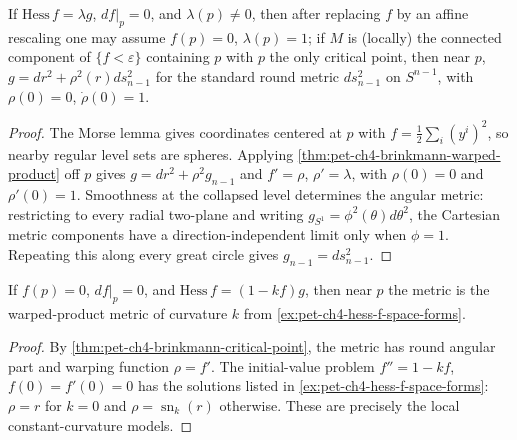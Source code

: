 \begin{theorem}
  \label{thm:pet-ch4-brinkmann-critical-point}
  If $\mathrm{Hess}\,f=\lambda g$, $df|_p=0$, and $\lambda(p)\ne0$, then after
  replacing $f$ by an affine rescaling one may assume $f(p)=0$, $\lambda(p)=1$;
  if $M$ is (locally) the connected component of $\{f<\varepsilon\}$ containing
  $p$ with $p$ the only critical point, then near $p$,
  $g=dr^2+\rho^2(r)ds_{n-1}^2$ for the standard round metric $ds_{n-1}^2$ on
  $S^{n-1}$, with $\rho(0)=0$, $\dot\rho(0)=1$.
\end{theorem}
\begin{proof}
  \sketch
  The Morse lemma gives coordinates centered at $p$ with
  $f=\tfrac12\sum_i(y^i)^2$, so nearby regular level sets are spheres. Applying
  \cref{thm:pet-ch4-brinkmann-warped-product} off $p$ gives
  $g=dr^2+\rho^2g_{n-1}$ and
  $f'=\rho$, $\rho'=\lambda$, with
  $\rho(0)=0$ and $\rho'(0)=1$. Smoothness at the collapsed level determines
  the angular metric: restricting to every radial two-plane and writing
  $g_{S^1}=\phi^2(\theta)d\theta^2$, the Cartesian metric components have a
  direction-independent limit only when $\phi=1$. Repeating this along every
  great circle gives $g_{n-1}=ds_{n-1}^2$.
\end{proof}


\begin{corollary}
  \label{cor:pet-ch4-brinkmann-constant-curvature}
  If $f(p)=0$, $df|_p=0$, and $\mathrm{Hess}\,f=(1-kf)g$, then near $p$ the metric
  is the warped-product metric of curvature $k$ from
  \cref{ex:pet-ch4-hess-f-space-forms}.
\end{corollary}
\begin{proof}
  \sketch
  By \cref{thm:pet-ch4-brinkmann-critical-point}, the metric has round angular
  part and warping function $\rho=f'$. The initial-value problem
  $f''=1-kf$, $f(0)=f'(0)=0$ has the solutions listed in
  \cref{ex:pet-ch4-hess-f-space-forms}: $\rho=r$ for $k=0$ and
  $\rho=\operatorname{sn}_k(r)$ otherwise. These are precisely the local
  constant-curvature models.
\end{proof}

